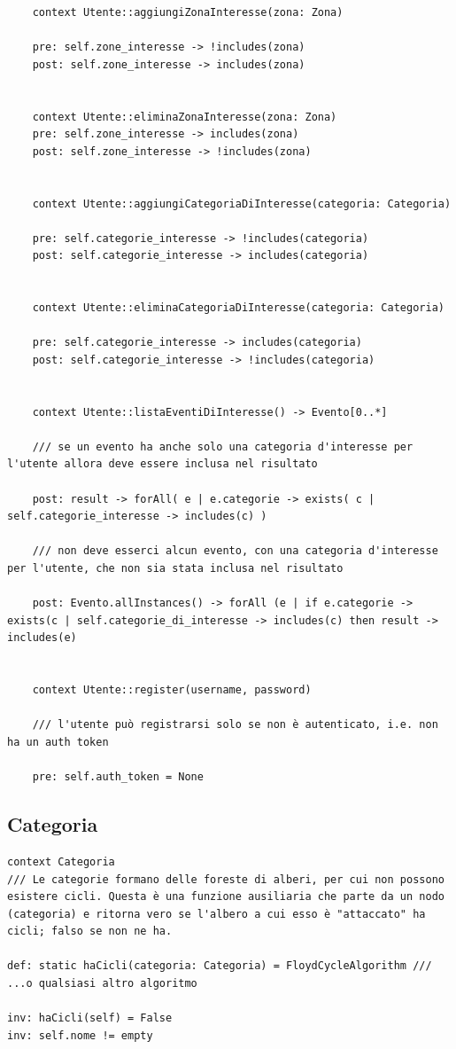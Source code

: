 \documentclass{article}
\begin{document}
\begin{verbatim}
	context Utente::aggiungiZonaInteresse(zona: Zona)
	
	pre: self.zone_interesse -> !includes(zona)
	post: self.zone_interesse -> includes(zona)
	
	
	context Utente::eliminaZonaInteresse(zona: Zona)
	pre: self.zone_interesse -> includes(zona)
	post: self.zone_interesse -> !includes(zona)
	
	
	context Utente::aggiungiCategoriaDiInteresse(categoria: Categoria)
	
	pre: self.categorie_interesse -> !includes(categoria)
	post: self.categorie_interesse -> includes(categoria)
	
	
	context Utente::eliminaCategoriaDiInteresse(categoria: Categoria)
	
	pre: self.categorie_interesse -> includes(categoria)
	post: self.categorie_interesse -> !includes(categoria)
	
	
	context Utente::listaEventiDiInteresse() -> Evento[0..*]
	
	/// se un evento ha anche solo una categoria d'interesse per l'utente allora deve essere inclusa nel risultato
	
	post: result -> forAll( e | e.categorie -> exists( c | self.categorie_interesse -> includes(c) )
	
	/// non deve esserci alcun evento, con una categoria d'interesse per l'utente, che non sia stata inclusa nel risultato
	
	post: Evento.allInstances() -> forAll (e | if e.categorie -> exists(c | self.categorie_di_interesse -> includes(c) then result -> includes(e)
	
	
	context Utente::register(username, password) 
	
	/// l'utente può registrarsi solo se non è autenticato, i.e. non ha un auth token
	
	pre: self.auth_token = None
\end{verbatim}

\subsection{Categoria}

\begin{verbatim}
context Categoria
/// Le categorie formano delle foreste di alberi, per cui non possono esistere cicli. Questa è una funzione ausiliaria che parte da un nodo (categoria) e ritorna vero se l'albero a cui esso è "attaccato" ha cicli; falso se non ne ha.

def: static haCicli(categoria: Categoria) = FloydCycleAlgorithm /// ...o qualsiasi altro algoritmo

inv: haCicli(self) = False
inv: self.nome != empty
\end{verbatim}
\end{document}
